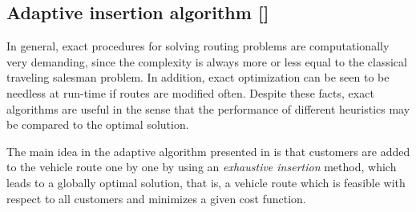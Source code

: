 \documentclass[dissertation,draft*]{aaltoseries}
\begin{document}
% 
% 


\subsection{Adaptive insertion algorithm []}
In general, exact procedures for solving routing  
problems are computationally very demanding, since the complexity is always more or 
less equal to the classical traveling salesman problem.
In addition, exact optimization can be seen to be needless at run-time if routes are modified often. 
Despite these facts, exact algorithms are useful in the sense that the 
performance of different heuristics may be compared to the optimal solution. 

The main idea in the adaptive algorithm presented in  is that customers are added to 
the vehicle route one by one by using an \emph{exhaustive insertion} method,
which leads to a globally optimal solution, that is, a vehicle route 
which is feasible with respect to all customers and minimizes a given cost function. 
\end{document}
